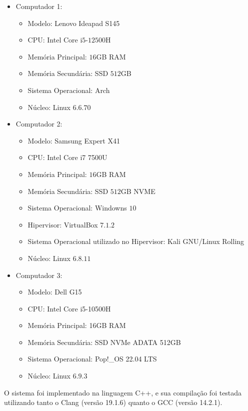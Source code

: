 \documentclass[
    12pt,				%
    oneside,   	        %
    a4paper,			%
    english,			%
    french,				%
    spanish,			%
    brazil,				%
    ]{pacotes/abntex2}
\begin{document}
\begin{itemize}
  \item Computador 1:
  \begin{itemize}
    \item Modelo: Lenovo Ideapad S145
    \item CPU: Intel Core i$5$-$12500$H
    \item Memória Principal: $16$GB RAM
    \item Memória Secundária: SSD $512$GB
    \item Sistema Operacional: Arch
  \item Núcleo: Linux $6.6.70$ 
  \end{itemize}
  \item Computador 2:
  \begin{itemize}
    \item Modelo: Samsung Expert X41
    \item CPU: Intel Core i7 7500U
    \item Memória Principal: $16$GB RAM
    \item Memória Secundária: SSD $512$GB NVME
    \item Sistema Operacional: Windowns $10$
    \item Hipervisor: VirtualBox $7.1.2$
    \item Sistema Operacional utilizado no Hipervisor: Kali GNU/Linux Rolling
    \item Núcleo: Linux $6.8.11$
  \end{itemize}
\end{itemize}
\begin{itemize}
    \item Computador 3:
    \begin{itemize}
        \item Modelo: Dell G15
        \item CPU: Intel Core i5-10500H 
        \item Memória Principal: 16GB RAM
        \item Memória Secundária: SSD NVMe ADATA 512GB
        \item Sistema Operacional: Pop!\_OS 22.04 LTS
        \item Núcleo: Linux $6.9.3$
        
    \end{itemize}
\end{itemize}
O sistema foi implementado na linguagem C++, e sua compilação foi testada utilizando tanto o Clang (versão 19.1.6) quanto o GCC (versão 14.2.1).
\end{document}
